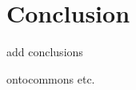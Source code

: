 \documentclass[ao]{iosart2x}
\begin{document}
\section{Conclusion}
 add conclusions




\begin{acks}
ontocommons etc.
\end{acks}

\nocite{label} 


\end{document}
